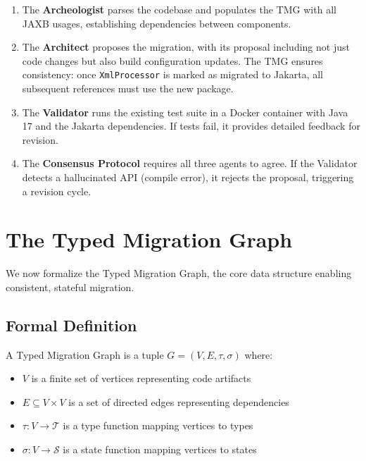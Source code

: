 \documentclass[sigconf,review,anonymous]{acmart}
\begin{document}
\begin{enumerate}
    \item The \textbf{Archeologist} parses the codebase and populates the TMG with all JAXB usages, establishing dependencies between components.
    
    \item The \textbf{Architect} proposes the migration, with its proposal including not just code changes but also build configuration updates. The TMG ensures consistency: once \texttt{XmlProcessor} is marked as migrated to Jakarta, all subsequent references must use the new package.
    
    \item The \textbf{Validator} runs the existing test suite in a Docker container with Java 17 and the Jakarta dependencies. If tests fail, it provides detailed feedback for revision.
    
    \item The \textbf{Consensus Protocol} requires all three agents to agree. If the Validator detects a hallucinated API (compile error), it rejects the proposal, triggering a revision cycle.
\end{enumerate}

\section{The Typed Migration Graph}
\label{sec:tmg}

We now formalize the Typed Migration Graph, the core data structure enabling consistent, stateful migration.

\subsection{Formal Definition}

\begin{definition}
A Typed Migration Graph is a tuple $G = (V, E, \tau, \sigma)$ where:
\begin{itemize}
    \item $V$ is a finite set of vertices representing code artifacts
    \item $E \subseteq V \times V$ is a set of directed edges representing dependencies
    \item $\tau : V \rightarrow \mathcal{T}$ is a type function mapping vertices to types
    \item $\sigma : V \rightarrow \mathcal{S}$ is a state function mapping vertices to states
\end{itemize}
\end{definition}
\end{document}
